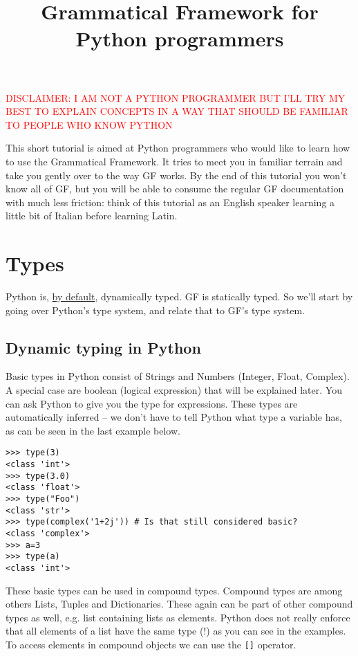 \documentclass{scrartcl}
\title{Grammatical Framework for Python programmers}
\newcommand{\note}[1]{\textcolor{red}{\uppercase{#1}}}
\begin{document}
\maketitle
\note{disclaimer: i am not a python programmer but i'll try my best to explain concepts in a way that should be familiar to people who know python}

This short tutorial is aimed at Python programmers who would like to learn how to use the Grammatical Framework. It tries to meet you in familiar terrain and take you gently over to the way GF works.
By the end of this tutorial you won't know all of GF, but you will be able to consume the regular GF documentation with much less friction: think of this tutorial as an English speaker learning a little bit of Italian before learning Latin.

\section{Types}

Python is, \href{https://medium.com/@ageitgey/learn-how-to-use-static-type-checking-in-python-3-6-in-10-minutes-12c86d72677b}{by default}, dynamically typed. GF is statically typed. So we'll start by going over Python's type system, and relate that to GF's type system.

\subsection{Dynamic typing in Python}

Basic types in Python consist of Strings and Numbers (Integer, Float, Complex). A special case are boolean (logical expression) that will be explained later.
You can ask Python to give you the type for expressions. These types are automatically inferred -- we don't have to tell Python what type
a variable has, as can be seen in the last example below.

\begin{verbatim}
>>> type(3)
<class 'int'>
>>> type(3.0)
<class 'float'>
>>> type("Foo")
<class 'str'>
>>> type(complex('1+2j')) # Is that still considered basic?
<class 'complex'>
>>> a=3
>>> type(a)
<class 'int'>
\end{verbatim}

These basic types can be used in compound types. Compound types are among others Lists, Tuples and Dictionaries.
These again can be part of other compound types as well, e.g. list containing lists as elements. Python does not really enforce
that all elements of a list have the same type (!) as you can see in the examples. To access elements in compound objects we
can use the \texttt{[]} operator.
\end{document}
